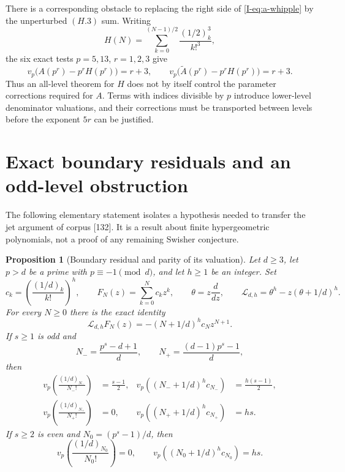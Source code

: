 \documentclass[11pt,letterpaper]{article}
\newtheorem{proposition}[theorem]{Proposition}
\numberwithin{equation}{section}
\begin{document}
There is a corresponding obstacle to replacing the right side of
\eqref{I-eq:a-whipple} by the unperturbed $(H.3)$ sum. Writing
\[
 H(N)=\sum_{k=0}^{(N-1)/2}\frac{(1/2)_k^3}{k!^3},
\]
the six exact tests $p=5,13$, $r=1,2,3$ give
\[
 v_p\bigl(A(p^r)-p^rH(p^r)\bigr)=r+3,
 \qquad
 v_p\bigl(\widetilde A(p^r)-p^rH(p^r)\bigr)=r+3.
\]
Thus an all-level theorem for $H$ does not by itself control the
parameter corrections required for $A$. Terms with indices divisible
by $p$ introduce lower-level denominator valuations, and their
corrections must be transported between levels before the exponent
$5r$ can be justified.


\section{Exact boundary residuals and an odd-level obstruction}\label{loc-I-7}\label{I-sec:parity-location}

The following elementary statement isolates a hypothesis needed to transfer
the jet argument of corpus [132]. It is a result about finite hypergeometric
polynomials, not a proof of any remaining Swisher conjecture.

\begin{proposition}[Boundary residual and parity of its valuation]
Let $d\geq3$, let $p>d$ be a prime with $p\equiv-1\pmod d$, and let
$h\geq1$ be an integer. Set
\[
 c_k=\left(\frac{(1/d)_k}{k!}\right)^h,\qquad
 F_N(z)=\sum_{k=0}^{N}c_kz^k,\qquad
 \theta=z\frac{d}{dz},\qquad
 \mathcal L_{d,h}=\theta^h-z(\theta+1/d)^h.
\]
For every $N\geq0$ there is the exact identity
\begin{equation}\label{I-eq:boundary-general}
 \mathcal L_{d,h}F_N(z)
   =-(N+1/d)^h c_Nz^{N+1}.
\end{equation}
If $s\geq1$ is odd and
\[
 N_- = \frac{p^s-d+1}{d},\qquad
 N_+ = \frac{(d-1)p^s-1}{d},
\]
then
\begin{align}
 v_p\!\left(\frac{(1/d)_{N_-}}{N_-!}\right)&=\frac{s-1}{2},
 &v_p\!\left((N_-+1/d)^h c_{N_-}\right)&=\frac{h(s-1)}2,
 \label{I-eq:short-valuation}\\
 v_p\!\left(\frac{(1/d)_{N_+}}{N_+!}\right)&=0,
 &v_p\!\left((N_++1/d)^h c_{N_+}\right)&=hs.
 \label{I-eq:long-valuation}
\end{align}
If $s\geq2$ is even and $N_0=(p^s-1)/d$, then
\begin{equation}\label{I-eq:even-valuation}
 v_p\!\left(\frac{(1/d)_{N_0}}{N_0!}\right)=0,
 \qquad
 v_p\!\left((N_0+1/d)^h c_{N_0}\right)=hs.
\end{equation}
\end{proposition}
\end{document}
